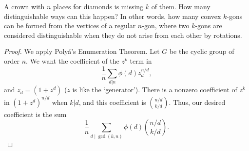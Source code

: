 \documentclass[11pt]{article}
\begin{document}
\begin{quest}
    A crown with $n$ places for diamonds is missing $k$ of them. How many distinguishable ways can this happen? In other words, how many convex $k$-gons can be formed from the vertices of a regular $n$-gon, where two $k$-gons are considered distinguishable when they do not arise from each other by rotations.
\end{quest}
\begin{proof}
    We apply Polyá's Enumeration Theorem. Let $G$ be the cyclic group of order $n$. We want the coefficient of the $z^k$ term in \[\frac{1}{n}\sum_{d|n}\phi(d)z_d^{n/d},\] and $z_d=(1+z^d)$ ($z$ is like the `generator'). There is a nonzero coefficient of $z^k$ in $(1+z^d)^{n/d}$ when $k|d$, and this coefficient is $\binom{n/d}{k/d}$. Thus, our desired coefficient is the sum \[\boxed{\frac{1}{n}\sum_{d\mid\gcd(k,n)}\phi(d)\binom{n/d}{k/d}}.\]
\end{proof}
\end{document}
